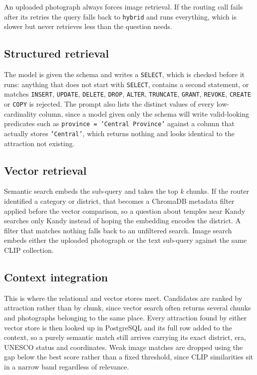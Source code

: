 \documentclass[11pt,a4paper]{article}
\newcommand{\code}[1]{\texttt{\small #1}}
\begin{document}
An uploaded photograph always forces image retrieval. If the routing call
fails after its retries the query falls back to \code{hybrid} and runs
everything, which is slower but never retrieves less than the question needs.

\subsection{Structured retrieval}
\label{sec:sqlretrieval}

The model is given the schema and writes a \code{SELECT}, which is checked
before it runs: anything that does not start with \code{SELECT}, contains a
second statement, or matches \code{INSERT}, \code{UPDATE}, \code{DELETE},
\code{DROP}, \code{ALTER}, \code{TRUNCATE}, \code{GRANT}, \code{REVOKE},
\code{CREATE} or \code{COPY} is rejected. The prompt also lists the distinct
values of every low-cardinality column, since a model given only the schema
will write valid-looking predicates such as \code{province = 'Central
Province'} against a column that actually stores \code{'Central'}, which
returns nothing and looks identical to the attraction not existing.

\subsection{Vector retrieval}

Semantic search embeds the sub-query and takes the top $k$ chunks. If the
router identified a category or district, that becomes a ChromaDB metadata
filter applied before the vector comparison, so a question about temples near
Kandy searches only Kandy instead of hoping the embedding encodes the
district. A filter that matches nothing falls back to an unfiltered search.
Image search embeds either the uploaded photograph or the text sub-query
against the same CLIP collection.

\subsection{Context integration}
\label{sec:integrate}

This is where the relational and vector stores meet. Candidates are ranked by
attraction rather than by chunk, since vector search often returns several
chunks and photographs belonging to the same place. Every attraction found by
either vector store is then looked up in PostgreSQL and its full row added to
the context, so a purely semantic match still arrives carrying its exact
district, era, UNESCO status and coordinates. Weak image matches are dropped
using the gap below the best score rather than a fixed threshold, since CLIP
similarities sit in a narrow band regardless of relevance.
\end{document}
